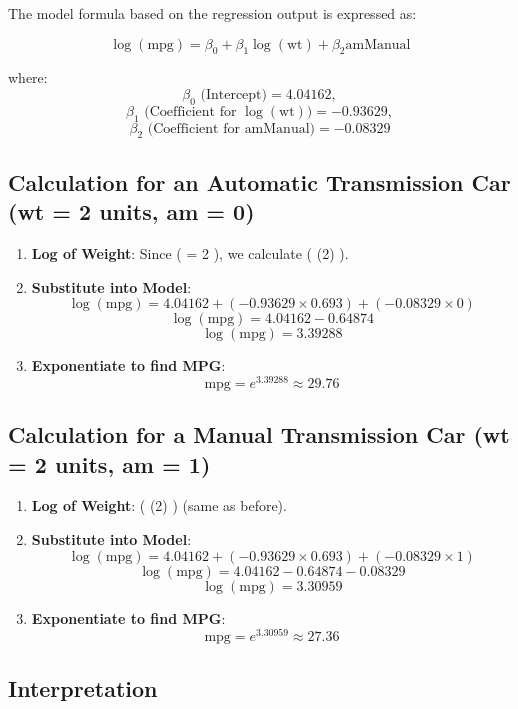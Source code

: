\documentclass[
  letterpaper,
  DIV=11,
  numbers=noendperiod]{scrreport}
\providecommand{\tightlist}{%
  \setlength{\itemsep}{0pt}\setlength{\parskip}{0pt}}\usepackage{longtable,booktabs,array}
\begin{document}
The model formula based on the regression output is expressed as:

\[
\log(\text{mpg}) = \beta_0 + \beta_1\log(\text{wt}) + \beta_2\text{amManual}
\]

where: \[
\beta_0 \text{ (Intercept)} = 4.04162,
\] \[
\beta_1 \text{ (Coefficient for } \log(\text{wt})) = -0.93629,
\] \[
\beta_2 \text{ (Coefficient for } \text{amManual}) = -0.08329
\]

\subsection{Calculation for an Automatic Transmission Car (wt = 2 units,
am =
0)}\label{calculation-for-an-automatic-transmission-car-wt-2-units-am-0}

\begin{enumerate}
\def\labelenumi{\arabic{enumi}.}
\tightlist
\item
  \textbf{Log of Weight}: Since (  = 2 ), we calculate (
  \log(2)  ).
\item
  \textbf{Substitute into Model}: \[
  \log(\text{mpg}) = 4.04162 + (-0.93629 \times 0.693) + (-0.08329 \times 0)
  \] \[
  \log(\text{mpg}) = 4.04162 - 0.64874
  \] \[
  \log(\text{mpg}) = 3.39288
  \]
\item
  \textbf{Exponentiate to find MPG}: \[
  \text{mpg} = e^{3.39288} \approx 29.76
  \]
\end{enumerate}

\subsection{Calculation for a Manual Transmission Car (wt = 2 units, am
= 1)}\label{calculation-for-a-manual-transmission-car-wt-2-units-am-1}

\begin{enumerate}
\def\labelenumi{\arabic{enumi}.}
\tightlist
\item
  \textbf{Log of Weight}: ( \log(2)  ) (same as before).
\item
  \textbf{Substitute into Model}: \[
  \log(\text{mpg}) = 4.04162 + (-0.93629 \times 0.693) + (-0.08329 \times 1)
  \] \[
  \log(\text{mpg}) = 4.04162 - 0.64874 - 0.08329
  \] \[
  \log(\text{mpg}) = 3.30959
  \]
\item
  \textbf{Exponentiate to find MPG}: \[
  \text{mpg} = e^{3.30959} \approx 27.36
  \]
\end{enumerate}

\subsection{Interpretation}\label{interpretation}
\end{document}
